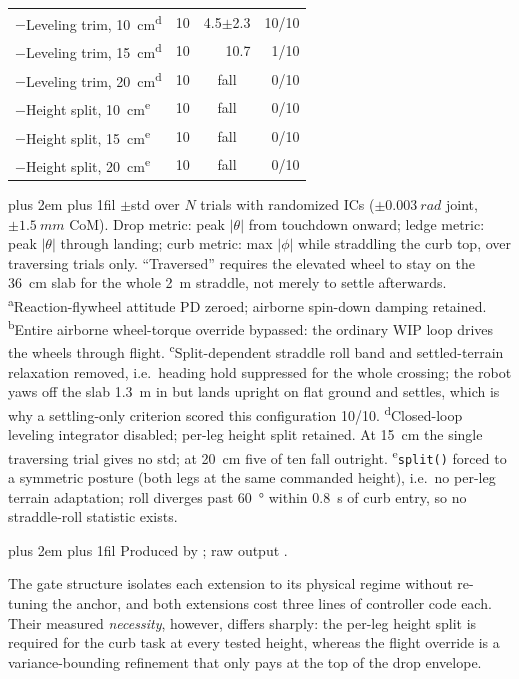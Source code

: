 \documentclass[a4paper,fleqn]{cas-dc}
\newcommand{\tabnote}{\par\leftskip=0pt\rightskip=0pt plus 2em%
  \parfillskip=0pt plus 1fil\relax}
\begin{document}
\begin{table}[pos=!tbp]
\begin{tabular}{@{}>{\raggedright\arraybackslash}p{3.5cm}rrr@{}}
\addlinespace[1pt]
$-$Leveling trim, \SI{10}{cm}\textsuperscript{d} & 10 & 4.5$\pm$2.3 & 10/10 \\
$-$Leveling trim, \SI{15}{cm}\textsuperscript{d} & 10 & 10.7 & 1/10 \\
$-$Leveling trim, \SI{20}{cm}\textsuperscript{d} & 10 & \multicolumn{1}{c}{fall} & 0/10 \\
\addlinespace[1pt]
$-$Height split, \SI{10}{cm}\textsuperscript{e} & 10 & \multicolumn{1}{c}{fall} & 0/10 \\
$-$Height split, \SI{15}{cm}\textsuperscript{e} & 10 & \multicolumn{1}{c}{fall} & 0/10 \\
$-$Height split, \SI{20}{cm}\textsuperscript{e} & 10 & \multicolumn{1}{c}{fall} & 0/10 \\
\bottomrule
\end{tabular}
\vspace{2pt}\tabnote\noindent
$\pm$std over $N$ trials with randomized ICs ($\pm\SI{0.003}{rad}$ joint,
$\pm\SI{1.5}{mm}$ CoM). Drop metric: peak $|\theta|$ from touchdown onward;
ledge metric: peak $|\theta|$ through landing; curb metric: max $|\phi|$ while
straddling the curb top, over traversing trials only. ``Traversed'' requires the
elevated wheel to stay on the \SI{36}{cm} slab for the whole \SI{2}{m} straddle,
not merely to settle afterwards.
\textsuperscript{a}Reaction-flywheel attitude PD zeroed; airborne spin-down damping retained.
\textsuperscript{b}Entire airborne wheel-torque override bypassed: the ordinary WIP loop drives the wheels through flight.
\textsuperscript{c}Split-dependent straddle roll band and settled-terrain relaxation removed, i.e.\ heading hold suppressed for the whole crossing; the robot yaws off the slab \SI{1.3}{m} in but lands upright on flat ground and settles, which is why a settling-only criterion scored this configuration 10/10.
\textsuperscript{d}Closed-loop leveling integrator disabled; per-leg height split retained. At \SI{15}{cm} the single traversing trial gives no std; at \SI{20}{cm} five of ten fall outright.
\textsuperscript{e}\texttt{split()} forced to a symmetric posture (both legs at the same commanded height), i.e.\ no per-leg terrain adaptation; roll diverges past \SI{60}{\degree} within \SI{0.8}{s} of curb entry, so no straddle-roll statistic exists.
\tabnote\noindent
Produced by ; raw output
.
\end{table}

The gate structure isolates each extension to its physical regime without
re-tuning the anchor, and both extensions cost three lines of controller code
each. Their measured \emph{necessity}, however, differs sharply: the per-leg
height split is required for the curb task at every tested height, whereas the
flight override is a variance-bounding refinement that only pays at the top of
the drop envelope.
\end{document}
